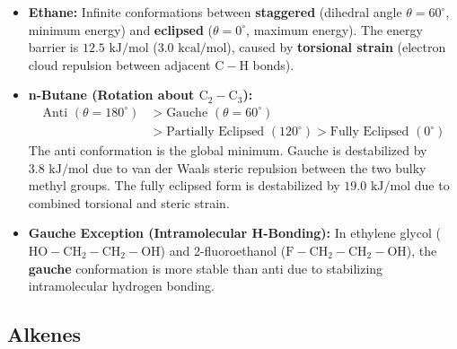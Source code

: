 \documentclass[10pt,twoside,openright]{book}
\begin{document}
\begin{usecasebox}
\begin{itemize}
  \item \textbf{Ethane:} Infinite conformations between \textbf{staggered} (dihedral angle $\theta = 60^\circ$, minimum energy) and \textbf{eclipsed} ($\theta = 0^\circ$, maximum energy). The energy barrier is $12.5\text{ kJ/mol}$ ($3.0\text{ kcal/mol}$), caused by \textbf{torsional strain} (electron cloud repulsion between adjacent $\mathrm{C-H}$ bonds).
  \item \textbf{n-Butane (Rotation about $\mathrm{C}_2-\mathrm{C}_3$):}
  \begin{align}
    \text{Anti } (\theta=180^\circ) &> \text{Gauche } (\theta=60^\circ) \\
    &> \text{Partially Eclipsed } (120^\circ) > \text{Fully Eclipsed } (0^\circ)
  \end{align}
  The anti conformation is the global minimum. Gauche is destabilized by $3.8\text{ kJ/mol}$ due to van der Waals steric repulsion between the two bulky methyl groups. The fully eclipsed form is destabilized by $19.0\text{ kJ/mol}$ due to combined torsional and steric strain.
  \item \textbf{Gauche Exception (Intramolecular H-Bonding):} In ethylene glycol ($\mathrm{HO-CH_2-CH_2-OH}$) and 2-fluoroethanol ($\mathrm{F-CH_2-CH_2-OH}$), the \textbf{gauche} conformation is more stable than anti due to stabilizing intramolecular hydrogen bonding.
\end{itemize}
\end{usecasebox}

\subsection{Alkenes}
\end{document}
